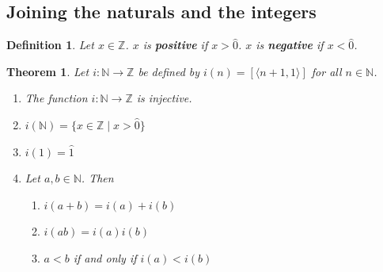 \documentclass{report}
\newtheorem{theorem}[theo]{Theorem}
\newtheorem{definition}[theo]{Definition}
\begin{document}
\subsection{Joining the naturals and the integers}
\begin{definition}
Let $x\in\mathbb Z$. $x$ is \textbf{positive} if $x>\hat0$. $x$ is \textbf{negative} if $x<\hat0$.
\end{definition}
\begin{theorem}\label{natural_integer_isomorphism}
Let $i:\mathbb N\to\mathbb Z$ be defined by $i(n)=[\langle n+1,1\rangle]$ for all $n\in\mathbb N$.
\begin{enumerate}
\item The function $i:\mathbb N\to\mathbb Z$ is injective.
\item $i(\mathbb N)=\{x\in\mathbb Z\mid x>\hat0\}$
\item $i(1)=\hat1$
\item Let $a,b\in\mathbb N$. Then
\begin{enumerate}
\item $i(a+b)=i(a)+i(b)$
\item $i(ab)=i(a)i(b)$
\item $a<b$ if and only if $i(a)<i(b)$
\end{enumerate}
\end{enumerate}
\end{theorem}
\end{document}
